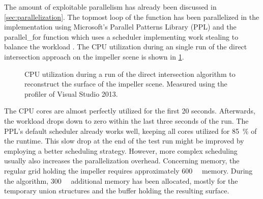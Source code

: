 The amount of exploitable parallelism has already been discussed in \cref{sec:parallelization}.
The topmost loop of the  function has been parallelized in the implementation using Microsoft's Parallel Patterns Library (PPL) and the parallel\_for function which uses a scheduler implementing work stealing to balance the workload \cite{ppl_parallel_for}.
The CPU utilization during an single run of the direct intersection approach on the impeller scene is shown in \cref{fig:di_cpu}.
%
\begin{figure}
	\centering
	\caption{
		CPU utilization during a run of the direct intersection algorithm to reconstruct the surface of the impeller scene.
		Measured using the profiler of Visual Studio 2013.
	}
	\label{fig:di_cpu}
\end{figure}
%
The CPU cores are almost perfectly utilized for the first 20 seconds.
Afterwards, the workload drops down to zero within the last three seconds of the run.
The PPL's default scheduler already works well, keeping all cores utilized for \SI{85}{\percent} of the runtime.
This slow drop at the end of the test run might be improved by employing a better scheduling strategy.
However, more complex scheduling usually also increases the parallelization overhead.
%
Concerning memory, the regular grid holding the impeller requires approximately \SI{600}{\mebi\byte} memory.
During the algorithm, \SI{300}{\mebi\byte} additional memory has been allocated, mostly for the temporary union structures and the buffer holding the resulting surface.

